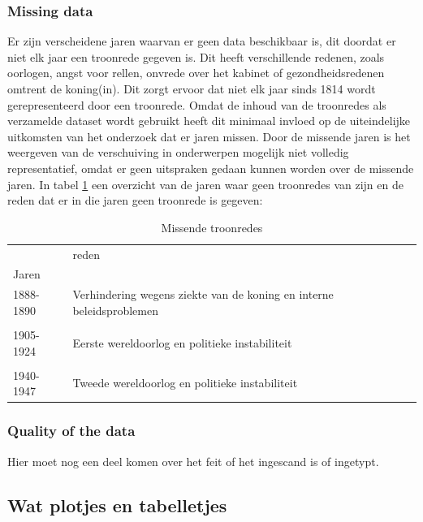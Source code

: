 \subsubsection{Missing data}
Er zijn verscheidene jaren waarvan er geen data beschikbaar is, dit doordat er niet elk jaar een troonrede gegeven is. Dit heeft verschillende redenen, zoals oorlogen, angst voor rellen, onvrede over het kabinet of gezondheidsredenen omtrent de koning(in). Dit zorgt ervoor dat niet elk jaar sinds 1814 wordt gerepresenteerd door een troonrede. Omdat de inhoud van de troonredes als verzamelde dataset wordt gebruikt heeft dit minimaal invloed op de uiteindelijke uitkomsten van het onderzoek dat er jaren missen. Door de missende jaren is het weergeven van de verschuiving in onderwerpen mogelijk niet volledig representatief, omdat er geen uitspraken gedaan kunnen worden over de missende jaren.
In tabel \ref{missing} een overzicht van de jaren waar geen troonredes van zijn en de reden dat er in die jaren geen troonrede is gegeven:
\newline
\newline
\begin{table}[htb]
\centering
\begin{tabular}{ll}
\toprule
{} &                       reden \\
Jaren     &                             \\
\midrule
1888-1890 &  Verhindering wegens ziekte van de koning en interne beleidsproblemen\\
\\
1905-1924 &         Eerste wereldoorlog en politieke instabiliteit\\
\\
1940-1947 &         Tweede wereldoorlog en politieke instabiliteit\\
\bottomrule
\end{tabular}
\caption{Missende troonredes}
\label{missing}
\end{table}

\subsubsection{Quality of the data}
Hier moet nog een deel komen over het feit of het ingescand is of ingetypt.

\subsection{Wat plotjes en tabelletjes}

